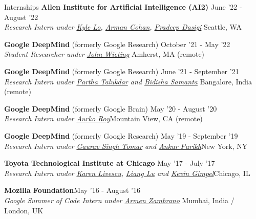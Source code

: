 \documentclass{resume} %
\begin{document}
\begin{rSection}{Internships}
\vspace*{0.1in}
{\bf Allen Institute for Artificial Intelligence (AI2)} { \hfill June '22 - August '22}\\ \textit{Research Intern under \href{https://kyleclo.github.io/}{Kyle Lo}, \href{http://armancohan.com/}{Arman Cohan}, \href{https://pdasigi.github.io/}{Pradeep Dasigi}} {\hfill Seattle, WA}

{\bf Google DeepMind} (formerly Google Research) { \hfill October '21 - May '22}\\ \textit{Student Researcher under \href{https://scholar.google.com/citations?user=Z0dGdDUAAAAJ&hl=en}{John Wieting}} {\hfill Amherst, MA (remote)}

{\bf Google DeepMind} (formerly Google Research) { \hfill June '21 - September '21}\\ \textit{Research Intern under \href{https://scholar.google.com/citations?user=CIZwXAcAAAAJ&hl=en}{Partha Talukdar} and \href{https://sites.google.com/view/bidisha-samanta/}{Bidisha Samanta}} {\hfill Bangalore, India (remote)}

{\bf Google DeepMind} (formerly Google Brain) { \hfill May '20 - August '20}\\ \textit{Research Intern under \href{https://sites.google.com/site/royaurko/}{Aurko Roy}}{\hfill Mountain View, CA (remote)}

{\bf Google DeepMind} (formerly Google Research) { \hfill May '19 - September '19}\\ \textit{Research Intern under \href{https://ai.google/research/people/GauravSinghTomar/}{Gaurav Singh Tomar} and \href{www.ankurparikh.com}{Ankur Parikh}}{\hfill New York, NY}

{\bf Toyota Technological Institute at Chicago}{ \hfill May '17 - July '17}\\ \textit{Research Intern under \href{http://ttic.uchicago.edu/~klivescu/}{Karen Livescu}, \href{http://ttic.uchicago.edu/~llu/}{Liang Lu} and \href{http://ttic.uchicago.edu/~kgimpel/}{Kevin Gimpel}}{\hfill Chicago, IL}

{\bf Mozilla Foundation}{\hfill May '16 - August '16} \\ \textit{Google Summer of Code Intern under \href{https://github.com/armenzg}{Armen Zambrano}}{ \hfill Mumbai, India / London, UK}
\end{rSection}

\vspace*{0.1in}
\end{document}
